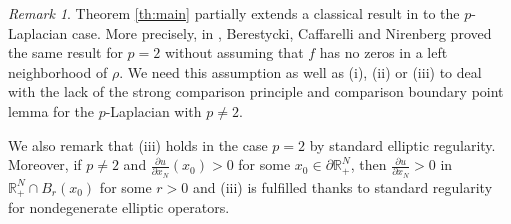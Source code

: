\documentclass[reqno]{amsart}
\theoremstyle{plain}
\theoremstyle{definition}
\theoremstyle{remark}
\newtheorem{remark}{Remark}
\begin{document}
	\begin{remark}	
		Theorem \ref{th:main} partially extends a classical result in \cite{MR1260436} to the $p$-Laplacian case. More precisely, in \cite[Theorem 1]{MR1260436}, Berestycki, Caffarelli and Nirenberg proved the same result for $p=2$ without assuming that $f$ has no zeros in a left neighborhood of $\rho$. We need this assumption as well as (i), (ii) or (iii) to deal with the lack of the strong comparison principle and comparison boundary point lemma for the $p$-Laplacian with $p\ne2$.
		
		We also remark that (iii) holds in the case $p=2$ by standard elliptic regularity. Moreover, if $p\ne2$ and $\frac{\partial u}{\partial x_N}(x_0)>0$ for some $x_0\in\partial\mathbb{R}^N_+$, then $\frac{\partial u}{\partial x_N}>0$ in $\mathbb{R}^N_+\cap B_r(x_0)$ for some $r>0$ and (iii) is fulfilled thanks to standard regularity for nondegenerate elliptic operators.
	\end{remark}
	
\end{document}
